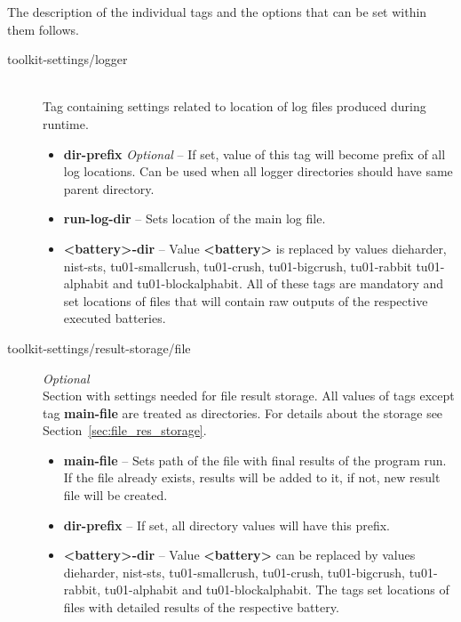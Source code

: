 \documentclass[
  digital,  	%
  color,		%
  oneside,   	%
  12pt,
  nocover,
  notable,
  nolof,
  nolot,
]{fithesis3}
\begin{document}
The description of the individual tags and the options that can be set within them follows.

\begin{description}
\item[toolkit-settings/logger] \hfill \\
Tag containing settings related to location of log files produced during runtime.
\begin{itemize}
\item \textbf{dir-prefix} \textit{Optional} -- If set, value of this tag will become prefix of all log locations. Can be used when all logger directories should have same parent directory.
\item \textbf{run-log-dir} -- Sets location of the main log file.
\item \textbf{<battery>-dir} -- Value \textbf{<battery>} is replaced by values dieharder, nist-sts, tu01-smallcrush, tu01-crush, tu01-bigcrush, tu01-rabbit tu01-alphabit and tu01-blockalphabit. All of these tags are mandatory and set locations of files that will contain raw outputs of the respective executed batteries.
\end{itemize}

\item[toolkit-settings/result-storage/file] \textit{Optional} \hfill \\
Section with settings needed for file result storage. All values of tags except tag \textbf{main-file} are treated as directories. For details about the storage see Section~\ref{sec:file_res_storage}.
\begin{itemize}
\item \textbf{main-file} -- Sets path of the file with final results of the program run. If the file already exists, results will be added to it, if not, new result file will be created.
\item \textbf{dir-prefix} -- If set, all directory values will have this prefix.
\item \textbf{<battery>-dir} -- Value \textbf{<battery>} can be replaced by values dieharder, nist-sts, tu01-smallcrush, tu01-crush, tu01-bigcrush, tu01-rabbit, tu01-alphabit and tu01-blockalphabit. The tags set locations of files with detailed results of the respective battery.
\end{itemize}


\end{description}
\end{document}
